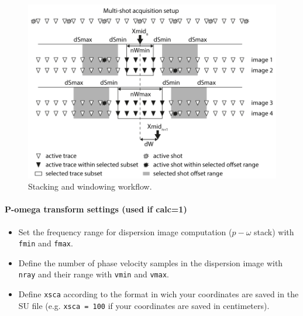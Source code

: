 \documentclass[twoside,a4paper]{article}
\begin{document}
\begin{figure}
\centerline{\includegraphics[width=0.75\linewidth]{figures/stack_wind.png}}
\caption{Stacking and windowing workflow.}
\label{fig:stack_wind}
\end{figure}

\paragraph{P-omega transform settings (used if calc=1)}
\begin{itemize}
\setlength\itemsep{2ex}
\setlength{\parindent}{5ex}

\item Set the frequency range for dispersion image computation ($p-\omega$ stack) with \verb|fmin| and \verb|fmax|.

\item Define the number of phase velocity samples in the dispersion image with \verb|nray| and their range with \verb|vmin| and \verb|vmax|.

\item Define \verb|xsca| according to the format in wich your coordinates are saved in the SU file (e.g. \verb|xsca = 100| if your coordinates are saved in centimeters).
\end{itemize}
\end{document}
